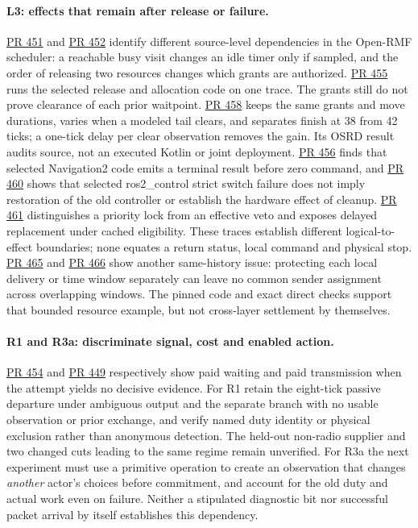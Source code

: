 \documentclass[11pt]{article}
\newcommand{\pr}[1]{\href{https://github.com/eternal-november/eos-research-programmes/pull/#1}{PR #1}}
\begin{document}
\paragraph{L3: effects that remain after release or failure.}
\pr{451} and \pr{452} identify different source-level dependencies in the Open-RMF scheduler: a reachable busy visit changes an idle timer only if sampled, and the order of releasing two resources changes which grants are authorized. \pr{455} runs the selected release and allocation code on one trace. The grants still do not prove clearance of each prior waitpoint. \pr{458} keeps the same grants and move durations, varies when a modeled tail clears, and separates finish at 38 from 42 ticks; a one-tick delay per clear observation removes the gain. Its OSRD result audits source, not an executed Kotlin or joint deployment. \pr{456} finds that selected Navigation2 code emits a terminal result before zero command, and \pr{460} shows that selected ros2\_control strict switch failure does not imply restoration of the old controller or establish the hardware effect of cleanup. \pr{461} distinguishes a priority lock from an effective veto and exposes delayed replacement under cached eligibility. These traces establish different logical-to-effect boundaries; none equates a return status, local command and physical stop. \pr{465} and \pr{466} show another same-history issue: protecting each local delivery or time window separately can leave no common sender assignment across overlapping windows. The pinned code and exact direct checks support that bounded resource example, but not cross-layer settlement by themselves.

\paragraph{R1 and R3a: discriminate signal, cost and enabled action.}
\pr{454} and \pr{449} respectively show paid waiting and paid transmission when the attempt yields no decisive evidence. For R1 retain the eight-tick passive departure under ambiguous output and the separate branch with no usable observation or prior exchange, and verify named duty identity or physical exclusion rather than anonymous detection. The held-out non-radio supplier and two changed cuts leading to the same regime remain unverified. For R3a the next experiment must use a primitive operation to create an observation that changes \emph{another} actor's choices before commitment, and account for the old duty and actual work even on failure. Neither a stipulated diagnostic bit nor successful packet arrival by itself establishes this dependency.
\end{document}
